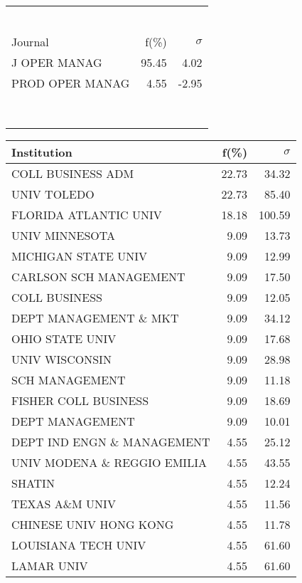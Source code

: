 \documentclass[a4paper,11pt]{report}
\begin{document}
\begin{landscape}
\begin{table}[!ht]
{\begin{tabular}{|l r  r|}
 &  & \\
 &  & \\
 &  & \\
 &  & \\
 &  & \\
 &  & \\
\hline
\hline
Journal & f(\%) & $\sigma$\\
\hline
J OPER MANAG & 95.45 & 4.02\\
PROD OPER MANAG & 4.55 & -2.95\\
 &  & \\
 &  & \\
 &  & \\
 &  & \\
 &  & \\
 &  & \\
 &  & \\
 &  & \\
\hline
\end{tabular}
}
{\scriptsize\begin{tabular}{|l r r|}
\hline
Institution & f(\%) & $\sigma$\\
\hline
COLL BUSINESS ADM & 22.73 & 34.32\\
UNIV TOLEDO & 22.73 & 85.40\\
FLORIDA ATLANTIC UNIV & 18.18 & 100.59\\
UNIV MINNESOTA & 9.09 & 13.73\\
MICHIGAN STATE UNIV & 9.09 & 12.99\\
CARLSON SCH MANAGEMENT & 9.09 & 17.50\\
COLL BUSINESS & 9.09 & 12.05\\
DEPT MANAGEMENT \& MKT & 9.09 & 34.12\\
OHIO STATE UNIV & 9.09 & 17.68\\
UNIV WISCONSIN & 9.09 & 28.98\\
SCH MANAGEMENT & 9.09 & 11.18\\
FISHER COLL BUSINESS & 9.09 & 18.69\\
DEPT MANAGEMENT & 9.09 & 10.01\\
DEPT IND ENGN \& MANAGEMENT & 4.55 & 25.12\\
UNIV MODENA \& REGGIO EMILIA & 4.55 & 43.55\\
SHATIN & 4.55 & 12.24\\
TEXAS A\&M UNIV & 4.55 & 11.56\\
CHINESE UNIV HONG KONG & 4.55 & 11.78\\
LOUISIANA TECH UNIV & 4.55 & 61.60\\
LAMAR UNIV & 4.55 & 61.60\\

\end{tabular}}
\end{table}
\end{landscape}
\end{document}
